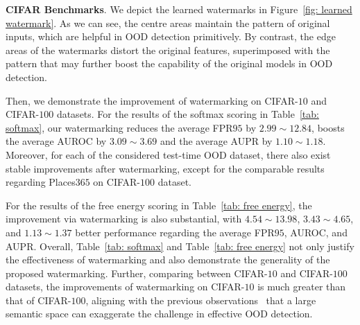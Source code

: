 \documentclass{article}
\begin{document}
\textbf{CIFAR Benchmarks}. 
We depict the learned watermarks in Figure~\ref{fig: learned watermark}. As we can see, the centre areas maintain the pattern of original inputs, which are helpful in OOD detection primitively. By contrast, the edge areas of the watermarks distort the original features, superimposed with the pattern that may further boost the capability of the original models in OOD detection. 

Then, we demonstrate the improvement of watermarking on CIFAR-$10$ and CIFAR-$100$ datasets. For the results of the softmax scoring in Table~\ref{tab: softmax}, our watermarking reduces the average FPR$95$ by $2.99\sim12.84$, boosts the average AUROC by $3.09\sim3.69$ and the average AUPR by $1.10\sim1.18$. Moreover, for each of the considered test-time OOD dataset, there also exist stable improvements after watermarking, except for the comparable results regarding Places$365$ on CIFAR-$100$ dataset. 

For the results of the free energy scoring in Table~\ref{tab: free energy}, the improvement via watermarking is also substantial, with $4.54\sim13.98$, $3.43\sim4.65$, and $1.13\sim1.37$ better performance regarding the average FPR$95$, AUROC, and AUPR. Overall, Table~\ref{tab: softmax} and Table~\ref{tab: free energy} not only justify the effectiveness of watermarking and also demonstrate the generality of the proposed watermarking. Further, comparing between CIFAR-$10$ and CIFAR-$100$ datasets, the improvements of watermarking on CIFAR-$10$ is much greater than that of CIFAR-$100$, aligning with the previous observations~\cite{HuangL21} that a large semantic space can exaggerate the challenge in effective OOD detection. 
\end{document}
